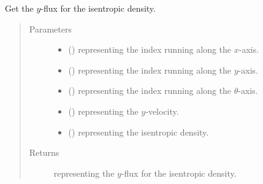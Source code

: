 \documentclass[letterpaper,10pt,english]{sphinxmanual}
\begin{document}
\begin{fulllineitems}
\begin{fulllineitems}
\begin{quote}
\begin{description}
\end{description}\end{quote}

\end{fulllineitems}


\begin{fulllineitems}
\label{\detokenize{api:tasmania.dycore.flux_isentropic_nonconservative_centered.FluxIsentropicNonconservativeCentered._get_centered_flux_y_s}}
Get the \(y\)-flux for the isentropic density.
\begin{quote}\begin{description}
\item[{Parameters}] \leavevmode\begin{itemize}
\item {} 
 () \textendash{}  representing the index running along the \(x\)-axis.

\item {} 
 () \textendash{}  representing the index running along the \(y\)-axis.

\item {} 
 () \textendash{}  representing the index running along the \(\theta\)-axis.

\item {} 
 () \textendash{}  representing the \(y\)-velocity.

\item {} 
 () \textendash{}  representing the isentropic density.

\end{itemize}

\item[{Returns}] \leavevmode
{} representing the \(y\)-flux for the isentropic density.


\end{description}
\end{quote}
\end{fulllineitems}
\end{fulllineitems}
\end{document}
